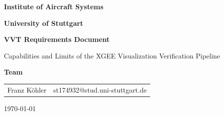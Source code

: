\documentclass{article}
\begin{document}
\begin{titlepage}
    \centering
    \par\vspace{2cm}

    {\Large \textbf{Institute of Aircraft Systems} \par}
    \vspace{0.5cm}
    {\large \textbf{University of Stuttgart} \par}
    \vspace{3cm}

    {\large \textbf{VVT Requirements Document} \par}
    {\large Capabilities and Limits of the XGEE Visualization Verification Pipeline \par}
    {\large  \par}
    \vspace{3cm}

    {\large \textbf{Team} \par}
    \vspace{0.5cm}
    \begin{tabular}{ll}
    Franz Köhler & st174932@stud.uni-stuttgart.de \\
    \end{tabular}
    \par\vspace{3cm}

    {\large \today \par}
\end{titlepage}

\tableofcontents

\pagestyle{plain}

\newpage %

\end{document}
